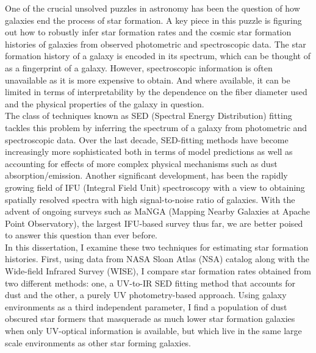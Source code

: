 


\doublespacing
One of the crucial unsolved puzzles in astronomy has been the question of how galaxies end the process of star formation. A key piece in this puzzle is figuring out how to robustly infer star formation rates and the cosmic star formation histories of galaxies from observed photometric and spectroscopic data. The star formation history of a galaxy is encoded in its spectrum, which can be thought of as a fingerprint of a galaxy. However, spectroscopic information is often unavailable as it is more expensive to obtain. And where available, it can be limited in terms of interpretability by the dependence on the fiber diameter used and the physical properties of the galaxy in question.\\

The class of techniques known as SED (Spectral Energy Distribution) fitting tackles this problem by inferring the spectrum of a galaxy from photometric and spectroscopic data. Over the last decade, SED-fitting methods have become increasingly more sophisticated both in terms of model predictions as well as accounting for effects of more complex physical mechanisms such as dust absorption/emission. Another significant development, has been the rapidly growing field of IFU (Integral Field Unit) spectroscopy with a view to obtaining spatially resolved spectra with high signal-to-noise ratio of galaxies. With the advent of ongoing surveys such as MaNGA (Mapping Nearby Galaxies at Apache Point Observatory), the largest IFU-based survey thus far, we are better poised to answer this question than ever before.\\

In this dissertation, I examine these two techniques for estimating star formation histories. First, using data from NASA Sloan Atlas (NSA) catalog along with the Wide-field Infrared Survey (WISE), I compare star formation rates obtained from two different methods: one, a UV-to-IR SED fitting method that accounts for dust and the other, a  purely UV photometry-based approach. Using galaxy environments as a third independent parameter, I find a population of dust obscured star formers that masquerade as much lower star formation galaxies when only UV-optical information is available, but which live in the same large scale environments as other star forming galaxies.\\

